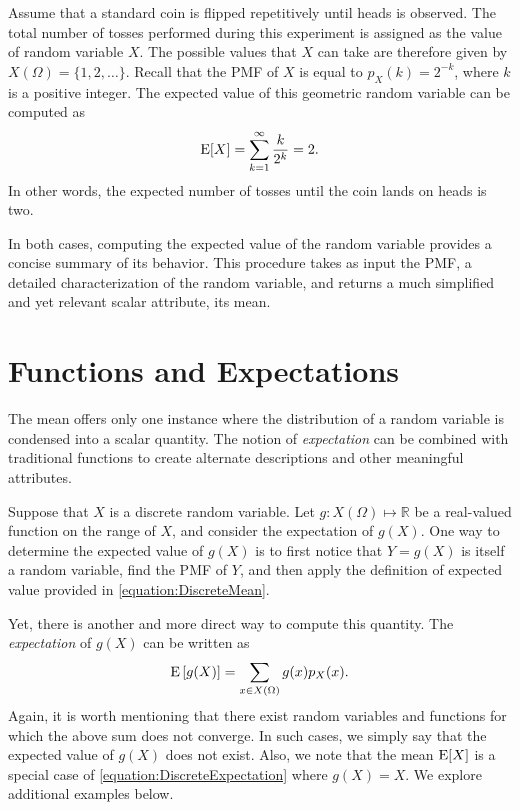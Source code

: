\begin{example}
Assume that a standard coin is flipped repetitively until heads is observed.
The total number of tosses performed during this experiment is assigned as the value of random variable $X$.
The possible values that $X$ can take are therefore given by $X (\Omega) = \{ 1, 2, \ldots \}$.
Recall that the PMF of $X$ is equal to $p_X(k) = 2^{-k}$, where $k$ is a positive integer.
The expected value of this geometric random variable can be computed as
\begin{equation*}
\mathrm{E} [X] = \sum_{k=1}^{\infty} \frac{k}{2^k}
= 2.
\end{equation*}
In other words, the expected number of tosses until the coin lands on heads is two.
\end{example}

In both cases, computing the expected value of the random variable provides a concise summary of its behavior.
This procedure takes as input the PMF, a detailed characterization of the random variable, and returns a much simplified and yet relevant scalar attribute, its mean.


\section{Functions and Expectations}

The mean offers only one instance where the distribution of a random variable is condensed into a scalar quantity.
The notion of \emph{expectation} can be combined with traditional functions to create alternate descriptions and other meaningful attributes. 

Suppose that $X$ is a discrete random variable.
Let $g: X(\Omega) \mapsto \mathbb{R}$ be a real-valued function on the range of $X$, and consider the expectation of $g(X)$.
One way to determine the expected value of $g(X)$ is to first notice that $Y = g(X)$ is itself a random variable, find the PMF of $Y$, and then apply the definition of expected value provided in \eqref{equation:DiscreteMean}.

Yet, there is another and more direct way to compute this quantity.
The \emph{expectation} of $g(X)$ can be written as 
\begin{equation} \label{equation:DiscreteExpectation}
\mathrm{E} \left[ g(X) \right]
= \sum_{x \in X(\Omega)} g(x) p_X (x) .
\end{equation}
Again, it is worth mentioning that there exist random variables and functions for which the above sum does not converge.
In such cases, we simply say that the expected value of $g(X)$ does not exist.
Also, we note that the mean $\mathrm{E} [X]$ is a special case of \eqref{equation:DiscreteExpectation} where $g(X) = X$.
We explore additional examples below.

